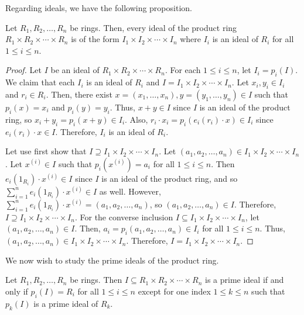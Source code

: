 Regarding ideals, we have the following proposition.

\begin{proposition}
    Let $R_{1}, R_{2}, \ldots, R_{n}$ be rings. Then, every ideal of the product ring $R_{1} \times R_{2} \times \cdots \times R_{n}$ is of the form $I_{1} \times I_{2} \times \cdots \times I_{n}$ where $I_{i}$ is an ideal of $R_{i}$ for all $1 \leq i \leq n$.
\end{proposition}
\begin{proof}
    Let $I$ be an ideal of $R_{1} \times R_{2} \times \cdots \times R_{n}$. For each $1 \leq i \leq n$, let $I_{i} = p_{i}(I)$. We claim that each $I_{i}$ is an ideal of $R_{i}$ and $I = I_{1} \times I_{2} \times \cdots \times I_{n}$. Let $x_{i},y_{i} \in I_{i}$ and $r_{i} \in R_{i}$. Then, there exist $x = (x_{1}, \ldots, x_{n}), y = (y_{1}, \ldots, y_{n}) \in I$ such that $p_{i}(x) = x_{i}$ and $p_{i}(y) = y_{i}$. Thus, $x + y \in I$ since $I$ is an ideal of the product ring, so $x_{i} + y_{i} = p_{i}(x+y) \in I_{i}$. Also, $r_{i} \cdot x_{i} = p_{i}(e_{i}(r_{i}) \cdot x) \in I_{i}$ since $e_{i}(r_{i}) \cdot x \in I$. Therefore, $I_{i}$ is an ideal of $R_{i}$.

    Let use first show that $I \supseteq I_{1} \times I_{2} \times \cdots \times I_{n}$. Let $(a_{1}, a_{2}, \ldots, a_{n}) \in I_{1} \times I_{2} \times \cdots \times I_{n}$. Let $x^{(i)} \in I$ such that $p_{i}(x^{(i)}) = a_{i}$ for all $1 \leq i \leq n$. Then $e_{i}(1_{R_{i}}) \cdot x^{(i)} \in I$ since $I$ is an ideal of the product ring, and so $\sum_{i=1}^{n} e_{i}(1_{R_{i}}) \cdot x^{(i)} \in I$ as well. However, $\sum_{i=1}^{n} e_{i}(1_{R_{i}}) \cdot x^{(i)} = (a_{1}, a_{2}, \ldots, a_{n})$, so $(a_{1}, a_{2}, \ldots, a_{n}) \in I$. Therefore, $I \supseteq I_{1} \times I_{2} \times \cdots \times I_{n}$. For the converse inclusion $I \subseteq I_{1} \times I_{2} \times \cdots \times I_{n}$, let $(a_{1},a_{2}, \ldots, a_{n}) \in I$. Then, $a_{i} = p_{i}(a_{1}, a_{2}, \ldots, a_{n}) \in I_{i}$ for all $1 \leq i \leq n$. Thus, $(a_{1}, a_{2}, \ldots, a_{n}) \in I_{1} \times I_{2} \times \cdots \times I_{n}$. Therefore, $I = I_{1} \times I_{2} \times \cdots \times I_{n}$.
\end{proof}

We now wish to study the prime ideals of the product ring. 

\begin{proposition}
    Let $R_{1}, R_{2}, \ldots, R_{n}$ be rings. Then $I \subseteq R_{1} \times R_{2} \times \cdots \times R_{n}$ is a prime ideal if and only if $p_{i}(I) = R_{i}$ for all $1 \leq i \leq n$ except for one index $1 \leq k \leq n$ such that $p_{k}(I)$ is a prime ideal of $R_{k}$.
\end{proposition}

